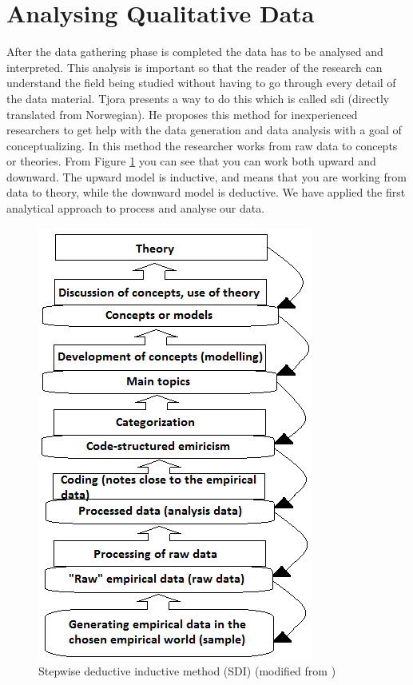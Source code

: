 \section{Analysing Qualitative Data}
After the data gathering phase is completed the data has to be analysed and interpreted. This analysis is important so that the reader of the research can understand the field being studied without having to go through every detail of the data material. Tjora \cite{tjora} presents a way to do this which is called \ac{sdi} (directly translated from Norwegian). He proposes this method for inexperienced researchers to get help with the data generation and data analysis with a goal of conceptualizing. In this method the researcher works from raw data to concepts or theories. From Figure \ref{fig:sdi} you can see that you can work both upward and downward. The upward model is inductive, and means that you are working from data to theory, while the downward model is deductive. We have applied the first analytical approach to process and analyse our data.

\begin{figure}
\centering
\includegraphics[scale=0.8]{sdi}
\caption[Stepwise deductive inductive method (SDI)]{Stepwise deductive inductive method (SDI) (modified from \cite{tjora})}
\label{fig:sdi}
\end{figure}

